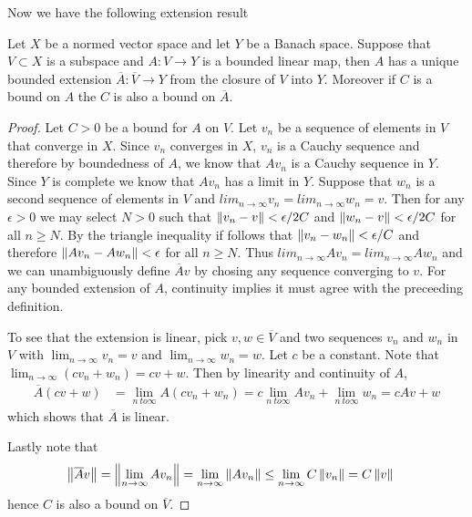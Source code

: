 Now we have the following extension result
\begin{lem}Let $X$ be a normed vector space and let $Y$ be a Banach
  space.  Suppose that $V \subset X$ is a subspace and $A : V \to Y$
  is a bounded linear map, then $A$ has a unique bounded extension
  $\overline{A} : \overline{V} \to Y$ from the closure of $V$ into
  $Y$.  Moreover if $C$ is a bound on $A$ the $C$ is also a bound on $\overline{A}$.
\end{lem}
\begin{proof}
  Let $C>0$ be a bound for $A$ on $V$.   Let $v_n$ be a sequence of elements in $V$ that converge in $X$.   Since $v_n$ converges in $X$, $v_n$ is a Cauchy sequence and therefore by
  boundedness of $A$, we know that $Av_n$ is a Cauchy sequence in $Y$.   Since $Y$ is complete we know that $A v_n$ has a limit in $Y$.   Suppose that
  $w_n$ is a second sequence of elements in $V$ and $lim_{n \to \infty} v_n = lim_{n \to \infty} w_n = v$.    Then for any $\epsilon>0$ we may select $N>0$ such that
  $\left \lVert v_n - v \right \rVert <\epsilon/2C$ and $\left \lVert w_n - v \right \rVert <\epsilon/2C$ for all $n \geq N$.   By the triangle inequality if follows that $\left \lVert v_n - w_n \right \rVert < \epsilon/C$  and therefore
  $\left \lVert A v_n - A w_n \right \rVert < \epsilon$ for all $n \geq N$.   Thus $lim_{n \to \infty} A v_n = lim_{n \to \infty} A w_n$ and we can unambiguously define $\overline{A} v$ by chosing any sequence converging to $v$.   For any bounded extension of $A$, continuity implies it must agree with the preceeding definition.

  To see that the extension is linear, pick $v, w \in \overline{V}$ and two sequences $v_n$ and $w_n$ in $V$ with $\lim_{n\to \infty} v_n = v$ and $\lim_{n\to \infty} w_n = w$.   Let $c$ be a constant.   Note that $\lim_{n\to \infty} (cv_n + w_n) = cv + w$.   Then by linearity and continuity of $A$,
  \begin{align*}
    \overline{A} (c v + w) &= \lim_{n\ to \infty} A ( c v_n + w_n) = c \lim_{n\ to \infty} A v_n +\lim_{n\ to \infty} w_n = c A v + w
  \end{align*}
  which shows that $\overline{A}$ is linear.

  Lastly note that
  \begin{align*}
    \left \lVert \overline{A} v \right \rVert &= \left \lVert \lim_{n \to \infty} A v_n \right \rVert = \lim_{n \to \infty}\left \lVert  A v_n \right \rVert \leq \lim_{n \to \infty}C \left \lVert  v_n \right \rVert = C\left \lVert v \right \rVert
  \end{align*}
  hence $C$ is also a bound on $\overline{V}$.
\end{proof}


